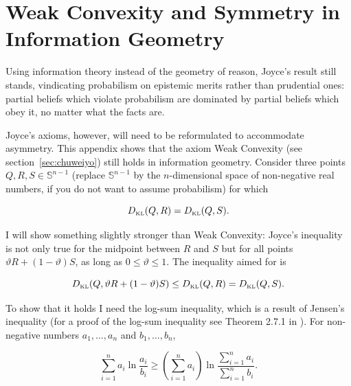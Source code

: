 \documentclass[phd,12pt,oneside]{ubcthesis}
\begin{document}
% 
 


\appendix

\chapter{Weak Convexity and Symmetry in Information Geometry}
\label{app:wcs}

Using information theory instead of the geometry of reason, Joyce's
result still stands, vindicating probabilism on epistemic merits
rather than prudential ones: partial beliefs which violate probabilism
are dominated by partial beliefs which obey it, no matter what the
facts are.

Joyce's axioms, however, will need to be reformulated to accommodate
asymmetry. This appendix shows that the axiom Weak Convexity (see
section~\ref{sec:chuweiyo}) still holds in information geometry. Consider
three points $Q,R,S\in\mathbb{S}^{n-1}$ (replace $\mathbb{S}^{n-1}$ by the
$n$-dimensional space of non-negative real numbers, if you do not want
to assume probabilism) for which

\begin{equation}
  \label{eq:app1}
  D_{\mbox{\tiny KL}}(Q,R)=D_{\mbox{\tiny KL}}(Q,S).
\end{equation}

I will show something slightly stronger than Weak Convexity: Joyce's
inequality is not only true for the midpoint between $R$ and $S$ but
for all points $\vartheta{}R+(1-\vartheta)S$, as long as
$0\leq\vartheta\leq{}1$. The inequality aimed for is

\begin{equation}
  \label{eq:app2}
  D_{\mbox{\tiny KL}}(Q,\vartheta{}R+(1-\vartheta)S)\leq{}D_{\mbox{\tiny KL}}(Q,R)=D_{\mbox{\tiny KL}}(Q,S).
\end{equation}

{\noindent}To show that it holds I need the log-sum inequality, which is a result
of Jensen's inequality (for a proof of the log-sum inequality see
Theorem 2.7.1 in ). For non-negative
numbers $a_{1},\ldots,a_{n}$ and $b_{1},\ldots,b_{n}$,

\begin{equation}
  \label{eq:logsum}
  \sum_{i=1}^{n}a_{i}\ln\frac{a_{i}}{b_{i}}\geq\left(\sum_{i=1}^{n}a_{i}\right)\ln\frac{\sum_{i=1}^{n}a_{i}}{\sum_{i=1}^{n}b_{i}}.
\end{equation}
\end{document}
